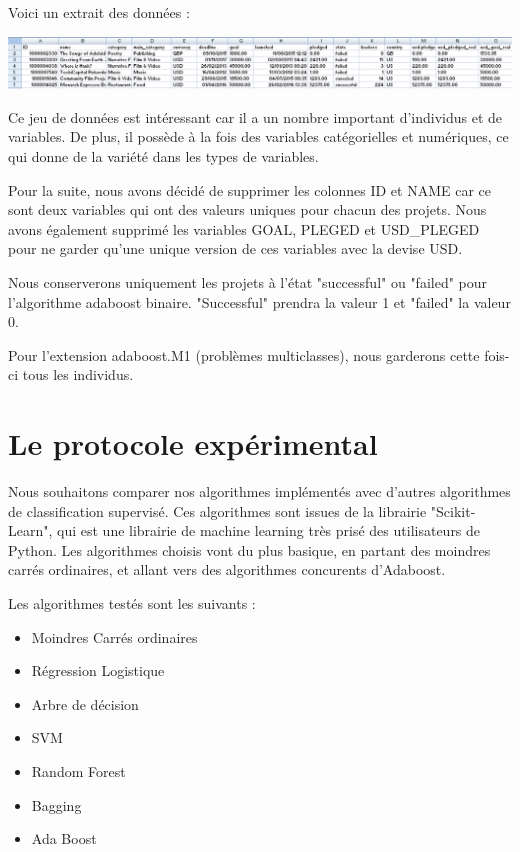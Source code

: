 \documentclass{article}
\begin{document}
\noindent Voici un extrait des données :

\begin{center} \includegraphics[scale=0.55]{extrait_donnees.PNG} \end{center}
\noindent Ce jeu de données est intéressant car il a un nombre important d'individus et de variables. De plus, il possède à la fois des variables catégorielles et numériques, ce qui donne de la variété dans les types de variables. \newline

\noindent Pour la suite, nous avons décidé de supprimer les colonnes ID et NAME car ce sont deux variables qui ont des valeurs uniques pour chacun des projets. Nous avons également supprimé les variables GOAL, PLEGED et USD\_PLEGED pour ne garder qu'une unique version de ces variables avec la devise USD.\newline

\noindent Nous conserverons uniquement les projets à l'état "successful" ou "failed" pour l'algorithme adaboost binaire. "Successful" prendra la valeur 1 et "failed" la valeur 0.\newline

\noindent Pour l'extension adaboost.M1 (problèmes multiclasses), nous garderons cette fois-ci tous les individus.


\section{Le protocole expérimental}

Nous souhaitons comparer nos algorithmes implémentés avec d'autres algorithmes de classification supervisé. Ces algorithmes sont issues de la librairie "Scikit-Learn", qui est une librairie de machine learning très prisé des utilisateurs de Python. Les algorithmes choisis vont du plus basique, en partant des moindres carrés ordinaires, et allant vers des algorithmes concurents d'Adaboost.

Les algorithmes testés sont les suivants :
\begin{itemize}
    \item Moindres Carrés ordinaires 
    \item Régression Logistique
    \item Arbre de décision
    \item SVM
    \item Random Forest
    \item Bagging
    \item Ada Boost
\end{itemize}
\end{document}
